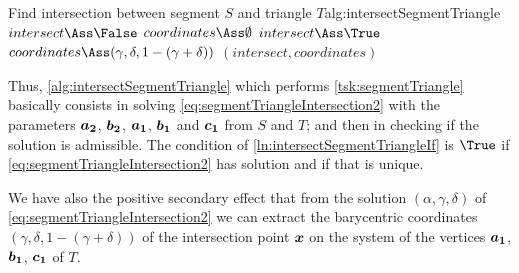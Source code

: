\documentclass[dissertation.tex]{subfiles}
\begin{document}
\begin{algo}{Find intersection between segment $S$ and triangle $T$}{alg:intersectSegmentTriangle}
  \State $intersect\Ass\False$
  \State $coordinates\Ass\emptyset$
  \label{ln:intersectSegmentTriangleIf}
  \State $intersect\Ass\True$
  \State $coordinates\Ass(\gamma, \delta, 1-(\gamma+\delta))$
  \EndIf
  \EndIf
  \State\Return $(intersect, coordinates)$
  \EndFunction
\end{algo}
Thus, \cref{alg:intersectSegmentTriangle} which performs \cref{tsk:segmentTriangle}
basically consists in solving
\cref{eq:segmentTriangleIntersection2} with the parameters $\boldsymbol{a_2}$,
$\boldsymbol{b_2}$, $\boldsymbol{a_1}$, $\boldsymbol{b_1}$ and $\boldsymbol{c_1}$ from $S$ and $T$;
and then in checking if the solution is admissible. The condition of
\cref{ln:intersectSegmentTriangleIf} is $\True$ if
\cref{eq:segmentTriangleIntersection2} has solution and if that
is unique.

We have also the positive secondary effect that from the solution
$(\alpha,\gamma,\delta)$ of \cref{eq:segmentTriangleIntersection2} we
can extract the barycentric coordinates $(\gamma, \delta,
1-(\gamma+\delta))$ of the intersection point $\boldsymbol{x}$ on the system of
the vertices $\boldsymbol{a_1}$, $\boldsymbol{b_1}$, $\boldsymbol{c_1}$ of $T$.
\end{document}
